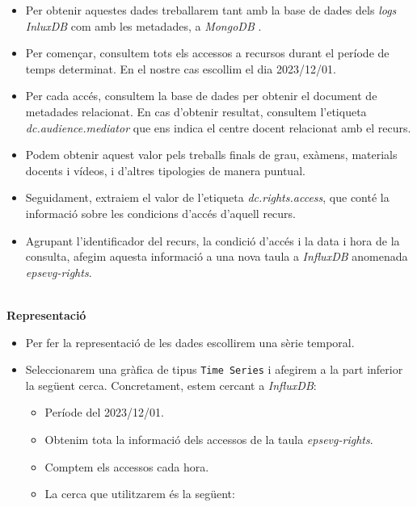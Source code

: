 \begin{itemize}
    \item Per obtenir aquestes dades treballarem tant amb la base de dades dels \textit{\gls{log}s} \textit{InluxDB} com amb les metadades, a \textit{MongoDB} .
    \item Per començar, consultem tots els accessos a recursos durant el període de temps determinat.
    En el nostre cas escollim el dia 2023/12/01.
    \item Per cada accés, consultem la base de dades per obtenir el document de metadades relacionat.
    En cas d'obtenir resultat, consultem l'etiqueta \textit{dc.audience.mediator} que ens indica el centre docent relacionat amb el recurs.
    \item Podem obtenir aquest valor pels treballs finals de grau, exàmens, materials docents i vídeos, i d'altres tipologies de manera puntual.
    \item Seguidament, extraiem el valor de l'etiqueta \textit{dc.rights.access}, que conté la informació sobre les condicions d'accés d'aquell recurs.
    \item Agrupant l'identificador del recurs, la condició d'accés i la data i hora de la consulta, afegim aquesta informació a una nova taula a \textit{InfluxDB} anomenada \textit{epsevg-rights}.

\end{itemize}

\clearpage

\noindent \\
\textbf{Representació}

\begin{itemize}
    \item Per fer la representació de les dades escollirem una sèrie temporal.
    \item Seleccionarem una gràfica de tipus \texttt{Time Series} i afegirem a la part inferior la següent cerca.
    Concretament, estem cercant a \textit{InfluxDB}:
    \begin{itemize}
        \item Període del 2023/12/01.
        \item Obtenim tota la informació dels accessos de la taula \textit{epsevg-rights}.
        \item Comptem els accessos cada hora.
        \item La cerca que utilitzarem és la següent:
    \end{itemize}
\end{itemize}

